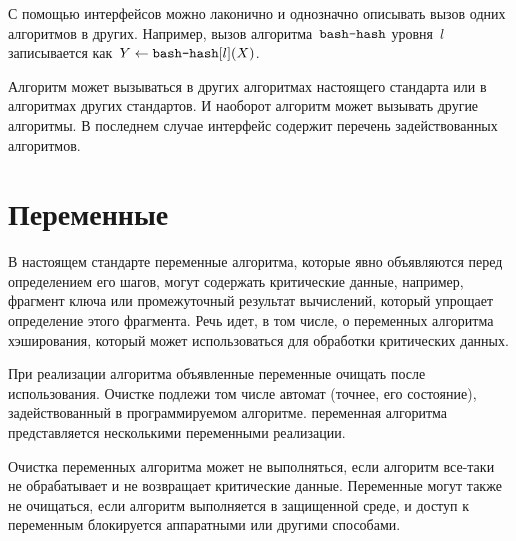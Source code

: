 С помощью интерфейсов можно лаконично и однозначно 
описывать вызов одних алгоритмов в других.
%        	
Например, вызов алгоритма~$\texttt{bash-hash}$ уровня~$l$
записывается как~$Y\leftarrow\texttt{bash-hash}[l](X)$.

Алгоритм может вызываться в других алгоритмах настоящего стандарта или 
в алгоритмах других стандартов. И наоборот алгоритм может вызывать другие 
алгоритмы. В последнем случае интерфейс содержит перечень задействованных 
алгоритмов.

\section{Переменные}\label{COMMON.Vars}

В настоящем стандарте переменные алгоритма, которые явно объявляются перед 
определением его шагов, могут содержать критические данные, например, фрагмент 
ключа или промежуточный результат вычислений, который упрощает определение 
этого фрагмента.
%
Речь идет, в том числе, о переменных алгоритма хэширования, 
который может использоваться для обработки критических данных.

При реализации алгоритма объявленные переменные  очищать после
использования. 
%
Очистке подлежи том числе автомат (точнее, его состояние),
задействованный в программируемом алгоритме.
%
 переменная алгоритма представляется
несколькими переменными реализации.

Очистка переменных алгоритма может не выполняться, если алгоритм все-таки 
не обрабатывает и не возвращает критические данные.
%
Переменные могут также не очищаться, если алгоритм выполняется в защищенной 
среде, и доступ к переменным блокируется аппаратными или другими способами.



